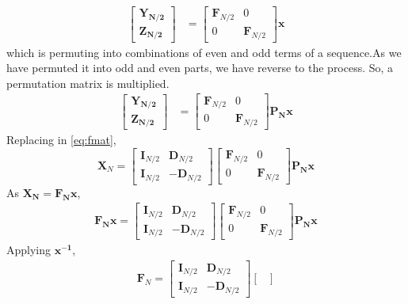 \documentclass[journal,12pt,twocolumn]{IEEEtran}
\let\vec\mathbf
\numberwithin{equation}{section}
\renewcommand\thesection{\arabic{section}}
\begin{document}
\begin{enumerate}[label=\arabic*.,ref=\thesection.\theenumi]
\begin{align}
\begin{bmatrix}
\vec{Y_{N/2}}\\\vec{Z_{N/2}}
\end{bmatrix}&=
\begin{bmatrix}
\vec{F}_{N/2} & 0 \\
0 & \vec{F}_{N/2}
\end{bmatrix}\vec{x}
\end{align}
which is permuting into combinations of even and odd terms of a sequence.As we have permuted it into odd and even parts, we have reverse to the process. So, a permutation matrix is multiplied.
\begin{align}
\begin{bmatrix}
\vec{Y_{N/2}}\\\vec{Z_{N/2}}
\end{bmatrix}&=
\begin{bmatrix}
\vec{F}_{N/2} & 0 \\
0 & \vec{F}_{N/2}
\end{bmatrix}\vec{P_N}\vec{x}
\end{align}
Replacing in \eqref{eq:fmat},
 \begin{equation}
\vec{X}_{N}=
\begin{bmatrix}
\vec{I}_{N/2} & \vec{D}_{N/2} \\
\vec{I}_{N/2} & -\vec{D}_{N/2}
\end{bmatrix}
\begin{bmatrix}
\vec{F}_{N/2} & 0 \\
0 & \vec{F}_{N/2}
\end{bmatrix}\vec{P_N}\vec{x}
\end{equation}
As $\vec{X_N}=\vec{F_N}\vec{x}$,
\begin{align}
\vec{F_N}\vec{x}=
\begin{bmatrix}
\vec{I}_{N/2} & \vec{D}_{N/2} \\
\vec{I}_{N/2} & -\vec{D}_{N/2}
\end{bmatrix}
\begin{bmatrix}
\vec{F}_{N/2} & 0 \\
0 & \vec{F}_{N/2}
\end{bmatrix}\vec{P_N}\vec{x}
\end{align}
Applying $\vec{x^{-1}}$,
\begin{align}
\label{eq:final}
\vec{F}_{N}=
\begin{bmatrix}
\vec{I}_{N/2} & \vec{D}_{N/2} \\
\vec{I}_{N/2} & -\vec{D}_{N/2}
\end{bmatrix}
\begin{bmatrix}

\end{bmatrix}
\end{align}
\end{enumerate}
\end{document}
